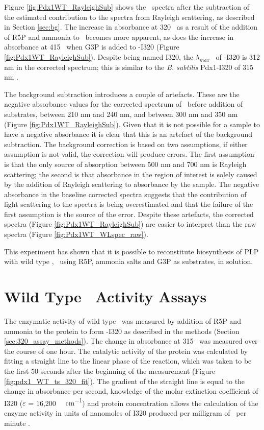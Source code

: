 Figure \ref{fig:Pdx1WT_RayleighSub} shows the \atpdx ~spectra after the subtraction of the estimated contribution to the spectra from Rayleigh scattering, as described in Section \ref{sec:bg}. The increase in absorbance at 320 \nm ~as a result of the addition of R5P and ammonia to \atpdx ~becomes more apparent, as does the increase in absorbance at 415 \nm ~when G3P is added to \atpdx -I320 (Figure \ref{fig:Pdx1WT_RayleighSub}). Despite being named I320, the $\lambda _{max}$ ~of \atpdx -I320 is 312 nm in the corrected spectrum; this is similar to the \textit{B. subtilis} Pdx1-I320 \lwl of 315 nm \cite{Raschle2007}.

The background subtraction introduces a couple of artefacts. These are the negative absorbance values for the corrected spectrum of \atpdx ~before addition of substrates, between 210 nm and 240 nm, and between 300 nm and 350 nm (Figure \ref{fig:Pdx1WT_RayleighSub}). Given that it is not possible for a sample to have a negative absorbance it is clear that this is an artefact of the background subtraction. The background correction is based on two assumptions, if either assumption is not valid, the correction will produce errors. The first assumption is that the only source of absorption between 500 nm and 700 nm is Rayleigh scattering; the second is that absorbance in the region of interest is solely caused by the addition of Rayleigh scattering to absorbance by the sample. The negative absorbance in the baseline corrected spectra suggests that the contribution of light scattering to the spectra is being overestimated and that the failure of the first assumption is the source of the error. Despite these artefacts, the corrected spectra (Figure \ref{fig:Pdx1WT_RayleighSub}) are easier to interpret than the raw spectra (Figure \ref{fig:Pdx1WT_WLspec_raw}).                       

This experiment has shown that it is possible to reconstitute biosynthesis of PLP with wild type \atpdx, ~using R5P, ammonia salts and G3P as substrates, in solution.
\clearpage
\section{Wild Type \atpdx ~Activity Assays}
\label{sec:WT_Assays}
The enzymatic activity of wild type \atpdx ~was measured by addition of R5P and ammonia to the protein to form \atpdx -I320 as described in the methods (Section \ref{sec:320_assay_methods}). The change in absorbance at 315 \nm ~was measured over the course of one hour. The catalytic activity of the protein was calculated by fitting a straight line to the linear phase of the reaction, which was taken to be the first 50 seconds after the beginning of the measurement (Figure \ref{fig:pdx1_WT_ts_320_fit}). The gradient of the straight line is equal to the change in absorbance per second, knowledge of the molar extinction coefficient of I320 ($\varepsilon$ = 16,200 {\si{\per\molar\per\centi\metre}}) and protein concentration allows the calculation of the enzyme activity in units of nanomoles of I320 produced per milligram of \atpdx ~per minute \cite{Raschle2006}.  


